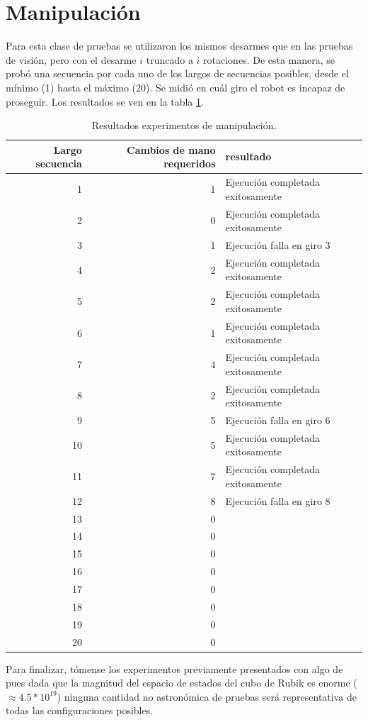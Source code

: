 \section{Manipulación}
Para esta clase de pruebas se utilizaron los mismos desarmes que en las pruebas de visión, pero con el desarme $i$ truncado a $i$ rotaciones. De esta manera, se probó una secuencia por cada uno de los largos de secuencias posibles, desde el mínimo (1) hasta el máximo (20). Se midió en cuál giro el robot es incapaz de proseguir. Los resultados se ven en la tabla \ref{resultadogiros}.

\begin{table}
	\centering
	\begin{tabular}{|r|r|l|}
		\hline
		Largo secuencia & Cambios de mano requeridos & resultado \\ \hline \hline
		 1 & 1 & Ejecución completada exitosamente \\ \hline
		 2 & 0 & Ejecución completada exitosamente \\ \hline
		 3 & 1 & Ejecución falla en giro 3 \\ \hline
		 4 & 2 & Ejecución completada exitosamente \\ \hline
		 5 & 2 & Ejecución completada exitosamente \\ \hline
		 6 & 1 & Ejecución completada exitosamente \\ \hline
		 7 & 4 & Ejecución completada exitosamente \\ \hline
		 8 & 2 & Ejecución completada exitosamente \\ \hline
		 9 & 5 & Ejecución falla en giro 6 \\ \hline
		10 & 5 & Ejecución completada exitosamente \\ \hline
		11 & 7 & Ejecución completada exitosamente \\ \hline
		12 & 8 & Ejecución falla en giro 8 \\ \hline
		13 & 0 &  \\ \hline
		14 & 0 &  \\ \hline
		15 & 0 &  \\ \hline
		16 & 0 &  \\ \hline
		17 & 0 &  \\ \hline
		18 & 0 &  \\ \hline
		19 & 0 &  \\ \hline
		20 & 0 &  \\ \hline
	\end{tabular}
	\caption{Resultados experimentos de manipulación.}
	\label{resultadogiros}
\end{table}

Para finalizar, tómense los experimentos previamente presentados con algo de pues dada que la magnitud del espacio de estados del cubo de Rubik es enorme ($\approx 4.5*10^{19}$) ninguna cantidad no astronómica de pruebas será representativa de todas las configuraciones posibles.
